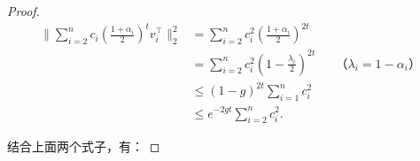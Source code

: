\documentclass[lang=cn,newtx,10pt,scheme=chinese,chinesefont=nofont,citestyle=gb7714-2015, bibstyle=gb7714-2015]{elegantbook}
\begin{document}
\begin{refsection}
\begin{proof}
    \begin{align*}
        \lVert \sum_{i=2}^n{c_i\left(\frac{1+\alpha_i}{2}\right)^tv_i^{\top}}\rVert_2^2&=\sum_{i=2}^n{c_i^2\left(\frac{1+\alpha_i}{2}\right)^{2t}}\\
        &=\sum_{i=2}^n{c_i^2\left(1-\frac{\lambda_i}{2}\right)^{2t}}&&\text{（$\lambda_i=1-\alpha_i$）}\\
        &\le (1-g)^{2t}\sum_{i=1}^n{c_i^2}\\
        &\le e^{-2gt}\sum_{i=2}^n{c_i^2}.
    \end{align*}

    结合上面两个式子，有：
    

\end{proof}
\end{refsection}
\end{document}
